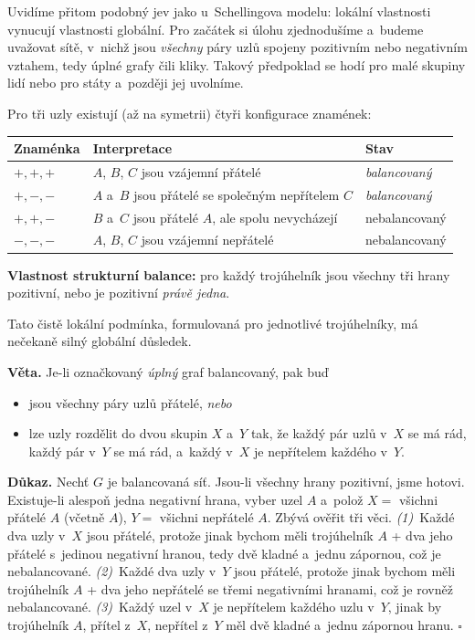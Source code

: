 \documentclass[11pt,a4paper]{article}
\theoremstyle{definition}
\begin{document}
Uvidíme přitom podobný jev jako u~Schellingova modelu: lokální vlastnosti vynucují vlastnosti
globální. Pro začátek si úlohu zjednodušíme a~budeme uvažovat sítě, v~nichž jsou \emph{všechny}
páry uzlů spojeny pozitivním nebo negativním vztahem, tedy úplné grafy čili kliky. Takový
předpoklad se hodí pro malé skupiny lidí nebo pro státy a~později jej uvolníme.

\begin{defbox}
Pro tři uzly existují (až na symetrii) čtyři konfigurace znamének:
\begin{center}
\small
\begin{tabular}{@{}p{3.0cm}p{9.5cm}p{2.4cm}@{}}
\toprule
\textbf{Znaménka} & \textbf{Interpretace} & \textbf{Stav} \\
\midrule
$+,+,+$ & $A$, $B$, $C$ jsou vzájemní přátelé & \emph{balancovaný} \\
$+,-,-$ & $A$ a~$B$ jsou přátelé se společným nepřítelem $C$ & \emph{balancovaný} \\
$+,+,-$ & $B$ a~$C$ jsou přátelé $A$, ale spolu nevycházejí & nebalancovaný \\
$-,-,-$ & $A$, $B$, $C$ jsou vzájemní nepřátelé & nebalancovaný \\
\bottomrule
\end{tabular}
\end{center}
\textbf{Vlastnost strukturní balance:} pro každý trojúhelník jsou všechny tři hrany pozitivní,
nebo je pozitivní \emph{právě jedna}.
\end{defbox}

Tato čistě lokální podmínka, formulovaná pro jednotlivé trojúhelníky, má nečekaně silný
globální důsledek.

\begin{defbox}
\textbf{Věta.} Je-li označkovaný \emph{úplný} graf balancovaný, pak buď
\begin{itemize}
\item jsou všechny páry uzlů přátelé, \emph{nebo}
\item lze uzly rozdělit do dvou skupin $X$ a~$Y$ tak, že každý pár uzlů v~$X$ se má rád,
      každý pár v~$Y$ se má rád, a~každý v~$X$ je nepřítelem každého v~$Y$.
\end{itemize}

\textbf{Důkaz.} Nechť $G$ je balancovaná síť. Jsou-li všechny hrany pozitivní, jsme hotovi.
Existuje-li alespoň jedna negativní hrana, vyber uzel $A$ a~polož
$X=$ všichni přátelé $A$ (včetně $A$), $Y=$ všichni nepřátelé $A$. Zbývá ověřit tři věci.
\emph{(1)}~Každé dva uzly v~$X$ jsou přátelé, protože jinak bychom měli trojúhelník
$A$ + dva jeho přátelé s~jedinou negativní hranou, tedy dvě kladné a~jednu zápornou, což je
nebalancované. \emph{(2)}~Každé dva uzly v~$Y$ jsou přátelé, protože jinak bychom měli
trojúhelník $A$ + dva jeho nepřátelé se třemi negativními hranami, což je rovněž
nebalancované. \emph{(3)}~Každý uzel v~$X$ je nepřítelem každého uzlu v~$Y$, jinak by
trojúhelník $A$, přítel z~$X$, nepřítel z~$Y$ měl dvě kladné a~jednu zápornou hranu.
$\square$
\end{defbox}
\end{document}

